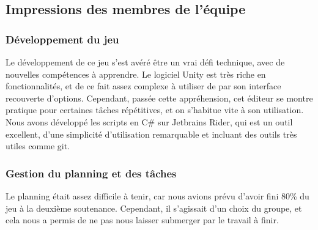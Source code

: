 \subsection{Impressions des membres de l'équipe}

    \subsubsection{Développement du jeu}

        Le développement de ce jeu s'est avéré être un vrai défi technique, avec de nouvelles compétences à apprendre. 
        Le logiciel Unity est très riche en fonctionnalités, et de ce fait assez complexe à utiliser de par son interface 
        recouverte d'options. Cependant, passée cette appréhension, cet éditeur se montre pratique pour certaines tâches répétitives, et 
        on s'habitue vite à son utilisation. Nous avons développé les scripts en C\# sur Jetbrains Rider, qui est un outil 
        excellent, d'une simplicité d'utilisation remarquable et incluant des outils très utiles comme git. 


    \subsubsection{Gestion du planning et des tâches}

        Le planning était assez difficile à tenir, car nous avions prévu d'avoir fini 80\% du jeu à la deuxième soutenance. 
        Cependant, il s'agissait d'un choix du groupe, et cela nous a permis de ne pas nous laisser submerger par le travail 
        à finir. 